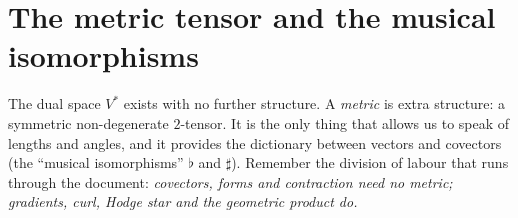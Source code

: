 \section{The metric tensor and the musical isomorphisms}\label{sec:metric}

The dual space $V^*$ exists with no further structure. A \emph{metric} is extra structure: a symmetric non-degenerate
$2$-tensor. It is the only thing that allows us to speak of lengths and angles, and it provides the dictionary
between vectors and covectors (the ``musical isomorphisms'' $\flat$ and $\sharp$). Remember the division of labour
that runs through the document: \emph{covectors, forms and contraction need no metric; gradients, curl, Hodge star and the geometric
product do.}




